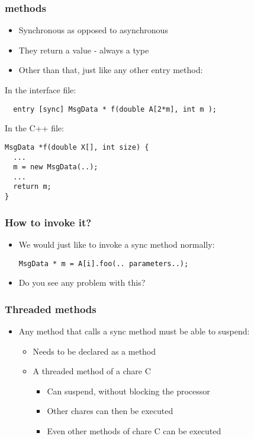 \begin{frame}[fragile]
\frametitle{ methods}
\begin{itemize}
 \item Synchronous as opposed to asynchronous
 \item They return a value - always a  type
 \item Other than that, just like any other entry method:
\end{itemize}
In the interface file:
\begin{lstlisting}
  entry [sync] MsgData * f(double A[2*m], int m ); 
\end{lstlisting}

In the C++ file:
\begin{lstlisting}
MsgData *f(double X[], int size) {
  ...
  m = new MsgData(..);
  ...
  return m;
}
\end{lstlisting}
\end{frame}

\begin{frame}[fragile]
\frametitle{How to invoke it?}
\begin{itemize}
 \item We would just like to invoke a sync method normally:
\begin{lstlisting}
MsgData * m = A[i].foo(.. parameters..);
\end{lstlisting}
  \item Do you see any problem with this?
\end{itemize}
\end{frame}

\begin{frame}[fragile]
\frametitle{Threaded methods}
\begin{itemize}
\item Any method that calls a sync method must be able to suspend:
  \begin{itemize}
  \item Needs to be declared as a  method
  \item A threaded method of a chare C
    \begin{itemize}
    \item Can suspend, without blocking the processor
    \item Other chares can then be executed
    \item Even other methods of chare C can be executed
    \end{itemize}
  \end{itemize}
\end{itemize}
\end{frame}

